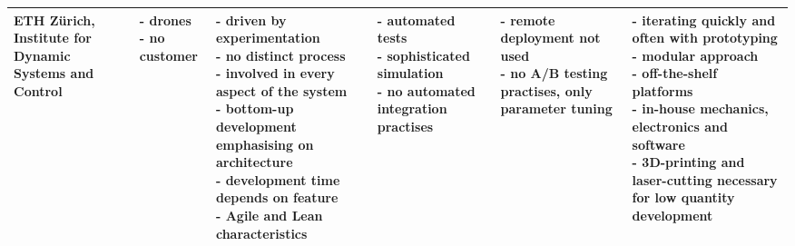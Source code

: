 \documentclass[english]{tktltiki2}
\begin{document}
\begin{landscape}
\begin{longtable}{|p{2.5cm}|p{1.5cm}|p{4cm}|p{4cm}|p{4cm}|p{4cm}|}
        ETH Zürich, Institute for Dynamic Systems and Control &
        \parbox[t]{1.5cm}{- drones \\
                          - no customer} &
        \parbox[t]{4cm}{- driven by experimentation \\
                        - no distinct process \\
                        - involved in every aspect of the system \\
                        - bottom-up development emphasising on architecture \\
                        - development time depends on feature \\
                        - Agile and Lean characteristics} &
        \parbox[t]{4cm}{- automated tests \\
                        - sophisticated simulation \\
                        - no automated integration practises} &
        \parbox[t]{4cm}{- remote deployment not used \\
                        - no A/B testing practises, only parameter tuning} &
        \parbox[t]{4cm}{- iterating quickly and often with prototyping \\
                        - modular approach \\
                        - off-the-shelf platforms \\
                        - in-house mechanics, electronics and software \\
                        - 3D-printing and laser-cutting necessary for low quantity development} \\

        \hline


\end{longtable}
\end{landscape}
\end{document}
